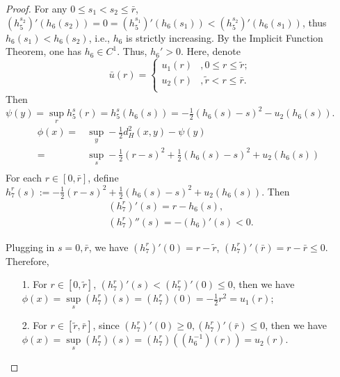 \begin{proof}
	For any $0\le s_1<s_2\le \bar{r}$, $ (h_5^{s_2})'(h_6(s_2)) =0 =  (h_5^{s_1})'(h_6(s_1)) < (h_5^{s_2})'(h_6(s_1))$, thus $h_6(s_1)<h_6(s_2)$, i.e., $h_6$ is strictly increasing. By the Implicit Function Theorem, one has $h_6 \in C^1$. Thus, $h_6' >0$.
	Here, denote
	\begin{equation*}
	\bar{u}(r)= 
	\begin{cases}
	u_1(r) & ,0\le r\le \tilde{r}; \\
	u_2(r) & ,\tilde{r} < r \le \bar{r}. \\
	\end{cases}
	\end{equation*}
	Then $\psi(y)=\sup\limits_{r}h_5^s(r) = h_5^s(h_6(s)) = -\frac{1}{2}(h_6(s)-s)^2 - u_2(h_6(s))$.
	\begin{equation*}
	\begin{split}
	\phi(x) =&\sup\limits_{y} -\frac{1}{2}d_H^2(x,y) - \psi(y)\\
	=&\sup\limits_{s} -\frac{1}{2}(r-s)^2+ \frac{1}{2}(h_6(s)-s)^2 + u_2(h_6(s)) \ \ \\ %
	\end{split}
	\end{equation*}
	For each $r\in [0,\bar{r}]$, define $h_7^r(s):=-\frac{1}{2}(r-s)^2+ \frac{1}{2}(h_6(s)-s)^2 + u_2(h_6(s))$. Then
	\begin{align*}
	(h_7^r)'(s)=r-h_6(s),\\
	(h_7^r)''(s)=-(h_6)'(s) < 0.
	\end{align*}
	
	Plugging in $s=0,\bar{r}$, we have $(h_7^r)'(0)=r-\tilde{r}$, $(h_7^r)'(\bar{r})=r-\bar{r}\le 0$. Therefore,
	\begin{itemize}
		\item [1.]  For  $r \in [0, \tilde{r}]$, $(h_7^r)'(s)< (h_7^r)'(0) \le 0$, then we have  $\phi(x) =\sup\limits_{s} (h_7^r)(s) = (h_7^r)(0)=-\frac{1}{2}r^2 = u_1(r)$;
		\item [2.] For  $r \in [ \tilde{r}, \bar{r}]$, since $(h_7^r)'(0) \ge 0, (h_7^r)'(\bar{r}) \le 0$, then we have  $\phi(x) =\sup\limits_{s} (h_7^r)(s) = (h_7^r)((h_6^{-1})(r))= u_2(r)$.
	\end{itemize}
	

\end{proof}
